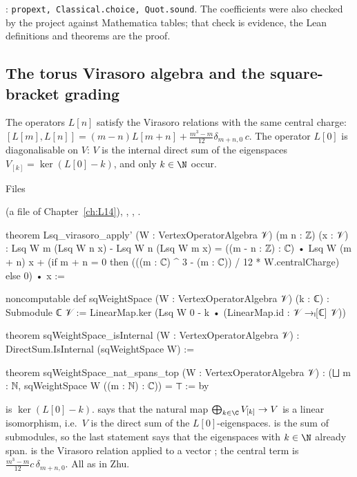 \begin{status}
: \texttt{propext, Classical.choice, Quot.sound}. The coefficients were also checked by the
project against Mathematica tables; that check is evidence,
the Lean definitions and theorems are the proof.
\end{status}

\subsection{The torus Virasoro algebra and the square-bracket grading}

\begin{theorem}\label{l15:thm:sqvir}
The operators $L[n]$ satisfy the Virasoro relations with the same central charge:
$[L[m],L[n]]=(m-n)L[m+n]+\frac{m^3-m}{12}\delta_{m+n,0}\,c$. The operator $L[0]$ is diagonalisable on $V$: $V$ is the
internal direct sum of the eigenspaces $V_{[k]}=\ker(L[0]-k)$, and only $k\in\N$ occur.
\end{theorem}
\noindent Files {\raggedright{} (a file of Chapter~\ref{ch:L14}),
,
, .\par}
\begin{leancode}
theorem Lsq_virasoro_apply' (W : VertexOperatorAlgebra 𝒱) (m n : ℤ) (x : 𝒱) :
    Lsq W m (Lsq W n x) - Lsq W n (Lsq W m x)
      = ((m - n : ℤ) : ℂ) • Lsq W (m + n) x
        + (if m + n = 0 then (((m : ℂ) ^ 3 - (m : ℂ)) / 12 * W.centralCharge) else 0) • x :=

noncomputable def sqWeightSpace (W : VertexOperatorAlgebra 𝒱) (k : ℂ) : Submodule ℂ 𝒱 :=
  LinearMap.ker (Lsq W 0 - k • (LinearMap.id : 𝒱 →ₗ[ℂ] 𝒱))

theorem sqWeightSpace_isInternal (W : VertexOperatorAlgebra 𝒱) :
    DirectSum.IsInternal (sqWeightSpace W) :=

theorem sqWeightSpace_nat_spans_top (W : VertexOperatorAlgebra 𝒱) :
    (⨆ m : ℕ, sqWeightSpace W ((m : ℕ) : ℂ)) = ⊤ := by
\end{leancode}

\begin{dictionary}
 is $\ker(L[0]-k)$.  says that the
natural map $\bigoplus_{k\in\C}V_{[k]}\to V$ is a linear isomorphism, i.e.\ $V$ is the direct sum of the $L[0]$-eigenspaces.
 is the sum of submodules, so the last statement says that the eigenspaces with $k\in\N$ already span.
 is the Virasoro relation applied to a vector ; the central term is
$\frac{m^3-m}{12}c\,\delta_{m+n,0}$. All as in Zhu.
\end{dictionary}

